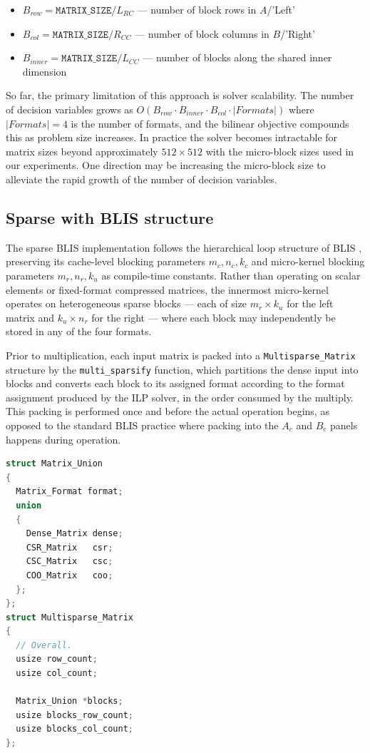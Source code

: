 \documentclass[sigconf, review, anonymous]{acmart}
\begin{document}
\begin{itemize}
    \item $B_{row} = \texttt{MATRIX\_SIZE} / L_{RC}$ --- number of block rows in $A$/'Left'
    \item $B_{col} = \texttt{MATRIX\_SIZE} / R_{CC}$ --- number of block columns in $B$/'Right'
    \item $B_{inner} = \texttt{MATRIX\_SIZE} / L_{CC}$ --- number of blocks along the shared inner dimension
\end{itemize}

So far, the primary limitation of this approach is solver scalability. The number of decision
variables grows as $O(B_{row} \cdot B_{inner} \cdot B_{col} \cdot |Formats|)$
where $|Formats| = 4$ is the number of
formats, and the bilinear objective compounds this as problem size increases. In
practice the solver becomes intractable for matrix sizes beyond approximately
$512 \times 512$ with the micro-block sizes used in our experiments. One direction may be
increasing the micro-block size to alleviate the rapid growth of the
number of decision variables.

\subsection{Sparse with BLIS structure}

The sparse BLIS implementation follows the hierarchical loop
structure of BLIS \cite{blis},
preserving its cache-level blocking parameters $m_c, n_c, k_c$ and micro-kernel blocking
parameters $m_r, n_r, k_u$ as compile-time constants. Rather than operating on scalar
elements or fixed-format compressed matrices, the innermost micro-kernel operates on
heterogeneous sparse blocks — each of size $m_r \times k_u$ for the left matrix and
$k_u \times n_r$ for the right — where each block may independently be stored in any
of the four formats.

Prior to multiplication, each input matrix is packed into a \texttt{Multisparse\_Matrix}
structure by the \texttt{multi\_sparsify} function, which partitions the dense input into
blocks and converts each block to its assigned format according to the format assignment
produced by the ILP solver, in the order consumed by the multiply.
This packing is performed once and before the actual operation begins, as opposed
to the standard BLIS practice where packing into the $A_c$ and $B_c$ panels happens
during operation.

\begin{lstlisting}[float, language=C, caption={Multisparse Matrix struct}]
struct Matrix_Union
{
  Matrix_Format format;
  union
  {
    Dense_Matrix dense;
    CSR_Matrix   csr;
    CSC_Matrix   csc;
    COO_Matrix   coo;
  };
};
struct Multisparse_Matrix
{
  // Overall.
  usize row_count;
  usize col_count;

  Matrix_Union *blocks;
  usize blocks_row_count;
  usize blocks_col_count;
};
\end{lstlisting}
\end{document}
